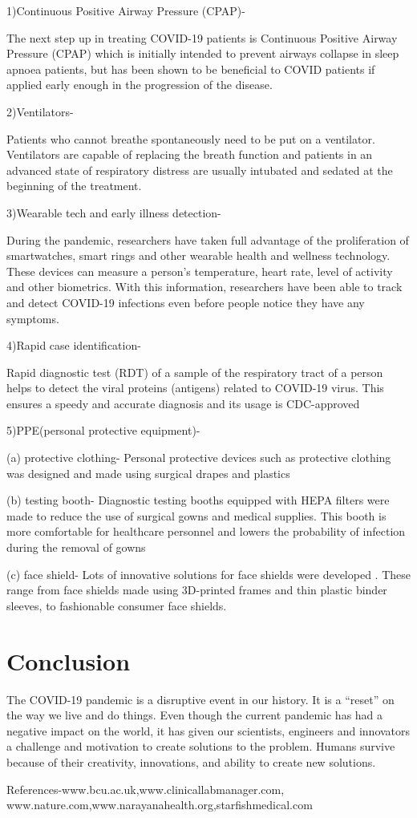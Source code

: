 \documentclass[11pt]{article}
\begin{document}
1)Continuous Positive Airway Pressure (CPAP)-

The next step up in treating COVID-19 patients is Continuous Positive Airway Pressure (CPAP) which is initially intended to prevent airways collapse in sleep apnoea patients, but has been shown to be beneficial to COVID patients if applied early enough in the progression of the disease.

2)Ventilators-

Patients who cannot breathe spontaneously need to be put on a ventilator. Ventilators are capable of replacing the breath function and patients in an advanced state of respiratory distress are usually intubated and sedated at the beginning of the treatment.

3)Wearable tech and early illness detection-

During the pandemic, researchers have taken full advantage of the proliferation of smartwatches, smart rings and other wearable health and wellness technology. These devices can measure a person’s temperature, heart rate, level of activity and other biometrics. With this information, researchers have been able to track and detect COVID-19 infections even before people notice they have any symptoms.

4)Rapid case identification-

Rapid diagnostic test (RDT) of a sample of the respiratory tract of a person helps to detect the viral proteins (antigens) related to COVID-19 virus. This ensures a speedy and accurate diagnosis and its usage is CDC-approved

5)PPE(personal protective equipment)-
 
(a)  protective clothing- Personal protective devices such as protective clothing was designed and made using surgical drapes and plastics  

(b) testing booth- Diagnostic testing booths equipped with HEPA filters  were made to reduce the use of   surgical gowns and medical supplies. This booth is more comfortable for healthcare personnel and lowers the probability of infection during the removal of gowns

(c) face shield- Lots of innovative solutions for face shields were developed . These range from face shields made using 3D-printed frames and thin plastic binder sleeves, to fashionable consumer face shields.

\section{\Huge Conclusion}

The COVID-19 pandemic is a disruptive event in our history. It is a “reset” on the way we live and do things.  Even though the current pandemic has had a negative impact on the world, it has given our scientists, engineers and innovators a challenge and motivation to create solutions to the problem.  Humans survive because of their creativity, innovations, and ability to create new solutions.







References-www.bcu.ac.uk,www.clinicallabmanager.com,
www.nature.com,www.narayanahealth.org,starfishmedical.com
\end{document}
